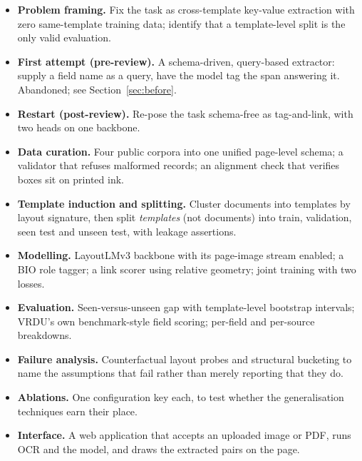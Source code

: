 \documentclass[11pt,a4paper]{article}
\begin{document}
\begin{itemize}[leftmargin=1.4em,itemsep=2pt]
  \item \textbf{Problem framing.} Fix the task as cross-template key-value extraction with zero
        same-template training data; identify that a template-level split is the only valid
        evaluation.
  \item \textbf{First attempt (pre-review).} A schema-driven, query-based extractor: supply a
        field name as a query, have the model tag the span answering it. Abandoned; see
        Section~\ref{sec:before}.
  \item \textbf{Restart (post-review).} Re-pose the task schema-free as tag-and-link, with two
        heads on one backbone.
  \item \textbf{Data curation.} Four public corpora into one unified page-level schema; a
        validator that refuses malformed records; an alignment check that verifies boxes sit on
        printed ink.
  \item \textbf{Template induction and splitting.} Cluster documents into templates by layout
        signature, then split \emph{templates} (not documents) into train, validation, seen test
        and unseen test, with leakage assertions.
  \item \textbf{Modelling.} LayoutLMv3 backbone with its page-image stream enabled; a BIO role tagger; a link scorer using relative
        geometry; joint training with two losses.
  \item \textbf{Evaluation.} Seen-versus-unseen gap with template-level bootstrap intervals;
        VRDU's own benchmark-style field scoring; per-field and per-source breakdowns.
  \item \textbf{Failure analysis.} Counterfactual layout probes and structural bucketing to name
        the assumptions that fail rather than merely reporting that they do.
  \item \textbf{Ablations.} One configuration key each, to test whether the generalisation
        techniques earn their place.
  \item \textbf{Interface.} A web application that accepts an uploaded image or PDF, runs OCR and
        the model, and draws the extracted pairs on the page.
\end{itemize}
\end{document}
